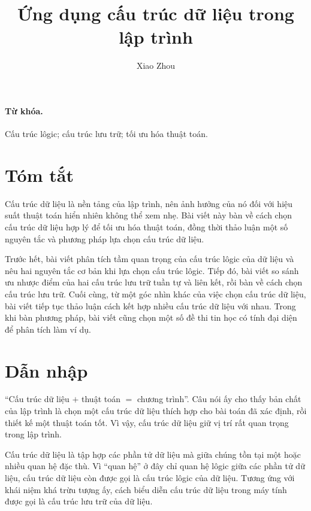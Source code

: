 \documentclass[11pt]{article}
\title{Ứng dụng cấu trúc dữ liệu trong lập trình}
\author{Xiao Zhou}
\date{}
\begin{document}
\maketitle


\renewcommand{\contentsname}{Mục lục}
\tableofcontents

\paragraph{Từ khóa.}
Cấu trúc lôgic; cấu trúc lưu trữ; tối ưu hóa thuật toán.

\section*{Tóm tắt}

Cấu trúc dữ liệu là nền tảng của lập trình, nên ảnh hưởng của nó đối với hiệu
suất thuật toán hiển nhiên không thể xem nhẹ. Bài viết này bàn về cách chọn
cấu trúc dữ liệu hợp lý để tối ưu hóa thuật toán, đồng thời thảo luận một số
nguyên tắc và phương pháp lựa chọn cấu trúc dữ liệu.

Trước hết, bài viết phân tích tầm quan trọng của cấu trúc lôgic của dữ liệu
và nêu hai nguyên tắc cơ bản khi lựa chọn cấu trúc lôgic. Tiếp đó, bài viết
so sánh ưu nhược điểm của hai cấu trúc lưu trữ tuần tự và liên kết, rồi bàn
về cách chọn cấu trúc lưu trữ. Cuối cùng, từ một góc nhìn khác của việc chọn
cấu trúc dữ liệu, bài viết tiếp tục thảo luận cách kết hợp nhiều cấu trúc dữ
liệu với nhau. Trong khi bàn phương pháp, bài viết cũng chọn một số đề thi
tin học có tính đại diện để phân tích làm ví dụ.

\section{Dẫn nhập}

``Cấu trúc dữ liệu \(+\) thuật toán \(=\) chương trình''. Câu nói ấy cho thấy
bản chất của lập trình là chọn một cấu trúc dữ liệu thích hợp cho bài toán đã
xác định, rồi thiết kế một thuật toán tốt. Vì vậy, cấu trúc dữ liệu giữ vị trí
rất quan trọng trong lập trình.

Cấu trúc dữ liệu là tập hợp các phần tử dữ liệu mà giữa chúng tồn tại một
hoặc nhiều quan hệ đặc thù. Vì ``quan hệ'' ở đây chỉ quan hệ lôgic giữa các
phần tử dữ liệu, cấu trúc dữ liệu còn được gọi là cấu trúc lôgic của dữ liệu.
Tương ứng với khái niệm khá trừu tượng ấy, cách biểu diễn cấu trúc dữ liệu
trong máy tính được gọi là cấu trúc lưu trữ của dữ liệu.
\end{document}
